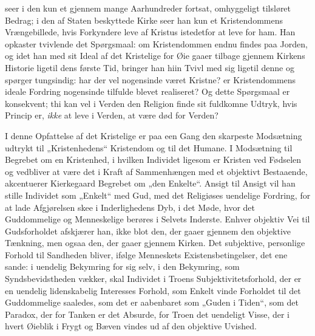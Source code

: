 \documentclass[12pt,a4paper,openany]{book}
\newcommand{\opage}[1]{\marginnote{\footnotesize\textit{[#1]}}}
\begin{document}
seer i den kun et gjennem mange Aarhundreder fortsat, omhyggeligt
tilsløret Bedrag; i den af Staten beskyttede Kirke
seer han kun et Kristendommens Vrængebillede, hvis Forkyndere
leve af Kristus istedetfor at leve for ham. Han
opkaster tvivlende det Spørgsmaal: om Kristendommen endnu
findes paa Jorden, og idet han med sit Ideal af det Kristelige
for Øie gaaer tilbage gjennem Kirkens Historie ligetil dens
første Tid, bringer han hiin Tvivl med sig ligetil denne
og spørger tungsindig: har der vel nogensinde været Kristne?
er Kristendommens ideale Fordring nogensinde tilfulde blevet
realiseret? Og dette Spørgsmaal er konsekvent; thi kan vel
i Verden den Religion finde sit fuldkomne Udtryk, hvis
Princip er, \emph{ikke} at leve i Verden, at være død for Verden?

I denne Opfattelse af det Kristelige er paa een Gang
den skarpeste Modsætning udtrykt til „Kristenhedens“ Kristendom
og til det Humane. I Modsætning til Begrebet om en
Kristenhed, i hvilken Individet ligesom er Kristen ved Fødselen
og vedbliver at være det i Kraft af Sammenhængen
\opage{435}med et objektivt Bestaaende, akcentuerer Kierkegaard Begrebet
om „den Enkelte“. Ansigt til Ansigt vil han stille Individet
som „Enkelt“ med Gud, med det Religiøses uendelige Fordring,
for at lade Afgjørelsen skee i Inderlighedens Dyb, i
det Møde, hvor det Guddommelige og Menneskelige berøres
i Selvets Inderste. Enhver objektiv Vei til Gudsforholdet
afskjærer han, ikke blot den, der gaaer gjennem den objektive
Tænkning, men ogsaa den, der gaaer gjennem Kirken. Det
subjektive, personlige Forhold til Sandheden bliver, ifølge
Menneskets Existensbetingelser, det ene sande: i uendelig
Bekymring for sig selv, i den Bekymring, som Syndsbevidstheden
vækker, skal Individet i Troens Subjektivitetsforhold,
der er en uendelig lidenskabelig Interesses Forhold, som Enkelt
vinde Forholdet til det Guddommelige saaledes, som det
er aabenbaret som „Guden i Tiden“, som det Paradox, der
for Tanken er det Absurde, for Troen det uendeligt Visse,
der i hvert Øieblik i Frygt og Bæven vindes ud af den
objektive Uvished.
\end{document}
